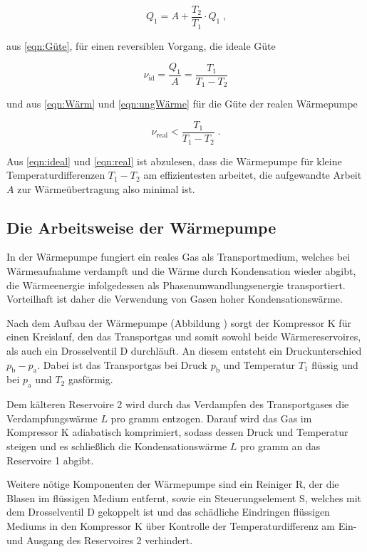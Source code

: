 \begin{equation*}
    Q_1 = A + \frac{T_2}{T_1} \cdot Q_1 \; \text{,}
\end{equation*}

aus \ref{eqn:Güte}, für einen reversiblen Vorgang, die ideale Güte

\begin{equation}
    \nu_\text{id} = \frac{Q_1}{A} = \frac{T_1}{T_1 - T_2}
    \label{eqn:ideal}
\end{equation}

und aus \ref{eqn:Wärm} und \ref{eqn:ungWärme} für die Güte der realen Wärmepumpe

\begin{equation}
    \nu_\text{real} < \frac{T_1}{T_1 - T_2} \; \text{.}
    \label{eqn:real}
\end{equation}

Aus \ref{eqn:ideal} und \ref{eqn:real} ist abzulesen, dass die Wärmepumpe für kleine
Temperaturdifferenzen $T_1 - T_2$ am effizientesten arbeitet, die aufgewandte Arbeit $A$ zur Wärmeübertragung
also minimal ist.

\subsection{Die Arbeitsweise der Wärmepumpe}

In der Wärmepumpe fungiert ein reales Gas als Transportmedium, welches bei Wärmeaufnahme verdampft und die Wärme
durch Kondensation wieder abgibt, die Wärmeenergie infolgedessen als Phasenumwandlungsenergie transportiert.
Vorteilhaft ist daher die Verwendung von Gasen hoher Kondensationswärme. 

Nach dem Aufbau der Wärmepumpe 
(Abbildung  ) sorgt der Kompressor K für einen Kreislauf, den das Transportgas und somit sowohl beide
Wärmereservoires, als auch ein Drosselventil D durchläuft. An diesem entsteht ein Druckunterschied $p_\text{b} 
- p_\text{a}$. Dabei ist das Transportgas bei Druck $p_\text{b}$ und Temperatur $T_1$ flüssig und bei $p_\text{a}$
und $T_2$ gasförmig.

Dem kälteren Reservoire 2 wird durch das Verdampfen des Transportgases die Verdampfungswärme $L$ pro gramm 
entzogen. Darauf wird das Gas im Kompressor K adiabatisch komprimiert, sodass dessen Druck und Temperatur steigen
und es schließlich die Kondensationswärme $L$ pro gramm an das Reservoire 1 abgibt.

Weitere nötige Komponenten der Wärmepumpe sind ein Reiniger R, der die Blasen im flüssigen Medium entfernt, sowie
ein Steuerungselement S, welches mit dem Drosselventil D gekoppelt ist und das schädliche Eindringen flüssigen 
Mediums in den Kompressor K über Kontrolle der Temperaturdifferenz am Ein- und Ausgang des Reservoires 2 verhindert.









